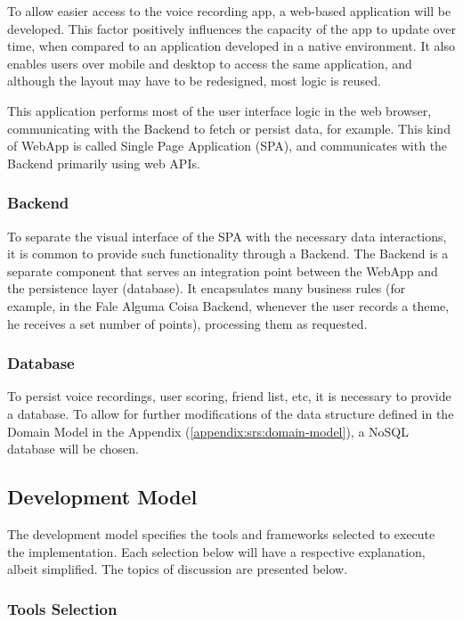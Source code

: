 To allow easier access to the voice recording app, a web-based application will be developed. This factor positively influences the capacity of the app to update over time, when compared to an application developed in a native environment. It also enables users over mobile and desktop to access the same application, and although the layout may have to be redesigned, most logic is reused. 

This application performs most of the user interface logic in the web browser, communicating with the Backend to fetch or persist data, for example. This kind of WebApp is called Single Page Application (SPA), and communicates with the Backend primarily using web APIs.

\subsubsection{Backend}

To separate the visual interface of the SPA with the necessary data interactions, it is common to provide such functionality through a Backend. The Backend is a separate component that serves an integration point between the WebApp and the persistence layer (database). It encapsulates many business rules (for example, in the Fale Alguma Coisa Backend, whenever the user records a theme, he receives a set number of points), processing them as requested.

\subsubsection{Database}

To persist voice recordings, user scoring, friend list, etc, it is necessary to provide a database. To allow for further modifications of the data structure defined in the Domain Model in the Appendix (\ref{appendix:srs:domain-model}), a NoSQL database will be chosen.

\subsection{Development Model}

The development model specifies the tools and frameworks selected to execute the implementation. Each selection below will have a respective explanation, albeit simplified. The topics of discussion are presented below.

\subsubsection{Tools Selection}

